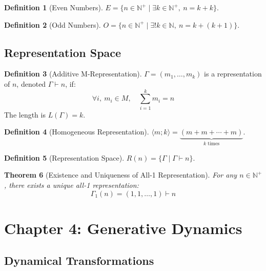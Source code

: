 \documentclass[12pt]{article}
\newtheorem{theorem}{Theorem}[section]
\theoremstyle{definition}
\newtheorem{definition}[theorem]{Definition}
\newcommand{\N}{\mathbb{N}}
\begin{document}
\begin{definition}[Even Numbers]
\(E = \{n \in \N^+ \mid \exists k \in \N^+,\ n = k + k\}\).
\end{definition}

\begin{definition}[Odd Numbers]
\(O = \{n \in \N^+ \mid \exists! k \in \N,\ n = k + (k+1)\}\).
\end{definition}

\subsection{Representation Space}

\begin{definition}[Additive M-Representation]
\(\Gamma = (m_1, \dots, m_k)\) is a representation of \(n\), denoted \(\Gamma \vdash n\), if:
\[
\forall i,\ m_i \in M,\quad \sum_{i=1}^k m_i = n
\]
The length is \(L(\Gamma) = k\).
\end{definition}

\begin{definition}[Homogeneous Representation]
\(\langle m; k \rangle = \underbrace{(m + m + \cdots + m)}_{k \text{ times}}\).
\end{definition}

\begin{definition}[Representation Space]
\(R(n) = \{\Gamma \mid \Gamma \vdash n\}\).
\end{definition}

\begin{theorem}[Existence and Uniqueness of All-1 Representation]
For any \(n \in \N^+\), there exists a unique all-1 representation:
\[
\Gamma_1(n) = (1,1,\dots,1) \vdash n
\]
\end{theorem}

\section{Chapter 4: Generative Dynamics}

\subsection{Dynamical Transformations}
\end{document}
